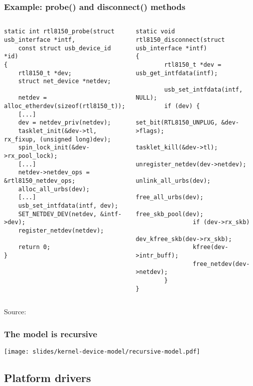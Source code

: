 \begin{frame}[fragile]
\frametitle{Example: probe() and disconnect() methods}
\begin{columns}
    \begin{block}{}
    \begin{verbatim}
static int rtl8150_probe(struct usb_interface *intf,
    const struct usb_device_id *id)
{
    rtl8150_t *dev;
    struct net_device *netdev;

    netdev = alloc_etherdev(sizeof(rtl8150_t));
    [...]
    dev = netdev_priv(netdev);
    tasklet_init(&dev->tl, rx_fixup, (unsigned long)dev);
    spin_lock_init(&dev->rx_pool_lock);
    [...]
    netdev->netdev_ops = &rtl8150_netdev_ops;
    alloc_all_urbs(dev);
    [...]
    usb_set_intfdata(intf, dev);
    SET_NETDEV_DEV(netdev, &intf->dev);
    register_netdev(netdev);

    return 0;
}
    \end{verbatim}
    \end{block}
    \begin{block}{}
    \begin{verbatim}
static void rtl8150_disconnect(struct usb_interface *intf)
{
        rtl8150_t *dev = usb_get_intfdata(intf);

        usb_set_intfdata(intf, NULL);
        if (dev) {
                set_bit(RTL8150_UNPLUG, &dev->flags);
                tasklet_kill(&dev->tl);
                unregister_netdev(dev->netdev);
                unlink_all_urbs(dev);
                free_all_urbs(dev);
                free_skb_pool(dev);
                if (dev->rx_skb)
                        dev_kfree_skb(dev->rx_skb);
                kfree(dev->intr_buff);
                free_netdev(dev->netdev);
        }
}
    \end{verbatim}
    \end{block}
\end{columns}
\vfill
Source: 
\end{frame}

\begin{frame}
  \frametitle{The model is recursive}
  \begin{center}
    \texttt{[image: slides/kernel-device-model/recursive-model.pdf]}
  \end{center}
\end{frame}

\subsection{Platform drivers}

